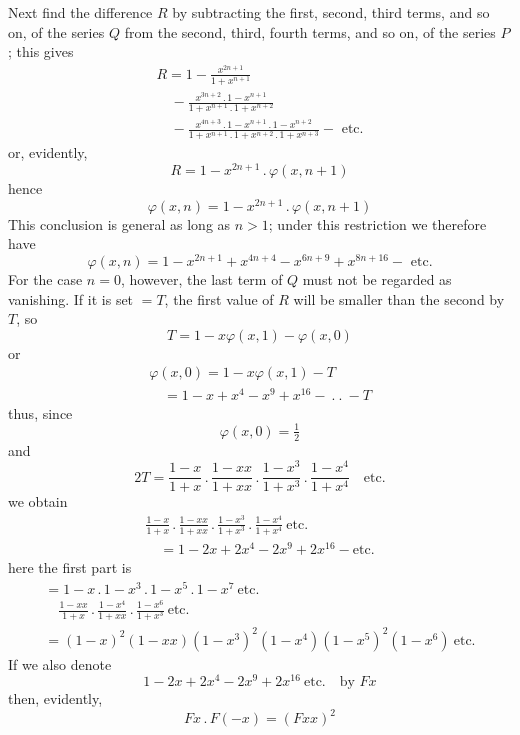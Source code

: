 Next find the difference $R$ by subtracting the first, second, third terms, and so on, of the series $Q$ from the second, third, fourth terms, and so on, of the series
$P$; this gives
\[
\begin{gathered}R=1-\frac{x^{2n+1}}{1+x^{n+1}}
\\[7pt]\quad{}-\frac{x^{3n+2}\mathbin{.}1-x^{n+1}}{1+x^{n+1}\mathbin{.}1+x^{n+2}}
\\[7pt]\quad{}-\frac{x^{4n+3}\mathbin{.}1-x^{n+1}\mathbin{.}1-x^{n+2}}{1+x^{n+1}\mathbin{.}1+x^{n+2}\mathbin{.}1+x^{n+3}}
-\text{ etc.}\end{gathered}
\]
or, evidently,
\[
R=1-x^{2n+1}\mathbin{.}\varphi(x,n+1)
\]
hence
\[
\varphi(x,n)=1-x^{2n+1}\mathbin{.}\varphi(x,n+1)
\]
This conclusion is general as long as $n>1$; under this restriction we therefore have
\[
\varphi(x,n)=1-x^{2n+1}+x^{4n+4}-x^{6n+9}+x^{8n+16}-\text{ etc.}
\]
For the case $n=0$, however, the last term of $Q$ must not be regarded as vanishing. If it is set $=T$, the first value of $R$ will be smaller than the second by
$T$, so
\[
T=1-x\varphi(x,1)-\varphi(x,0)
\]
or
\[
\begin{gathered}\varphi(x,0)=1-x\varphi(x,1)-T\\[7pt]\quad{}=1-x+x^4-x^9+x^{16}-\ .\ .\ -T\end{gathered}
\]
thus, since
\[
\varphi(x,0)=\tfrac12
\]
and
\[
2T=\frac{1-x}{1+x}\mathbin{.}\frac{1-xx}{1+xx}\mathbin{.}\frac{1-x^3}{1+x^3}\mathbin{.}\frac{1-x^4}{1+x^4}\quad\text{etc.}
\]
we obtain
\[
\begin{gathered}\frac{1-x}{1+x}\,.\,\frac{1-xx}{1+xx}\,.\,\frac{1-x^3}{1+x^3}\,.\,\frac{1-x^4}{1+x^4}\ \text{etc.}
\\[7pt]\quad{}=1-2x+2x^4-2x^9+2x^{16}-\text{etc.}\end{gathered}
\]
here the first part is
\[
\begin{gathered}
=1-x\,.\,1-x^3\,.\,1-x^5\,.\,1-x^7\ \text{etc.}\quad
\\[7pt]\quad{}\frac{1-xx}{1+x}\,.\,\frac{1-x^4}{1+xx}\,.\,\frac{1-x^6}{1+x^3}\ \text{etc.}\\[7pt]
=(1-x)^2(1-xx)(1-x^3)^2(1-x^4)(1-x^5)^2(1-x^6)\ \text{etc.}
\end{gathered}
\]
If we also denote
\[
1-2x+2x^4-2x^9+2x^{16}\ \text{etc.}\quad\text{by }Fx
\]
then, evidently,
\[
Fx\,.\,F(-x)=(Fxx)^2
\]
\clearpage
\endgroup
